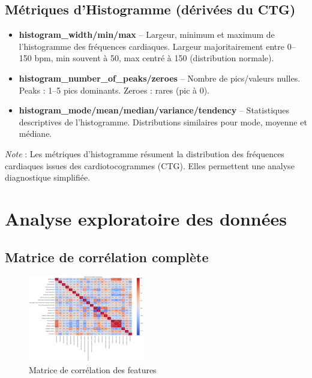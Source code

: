 \documentclass[twocolumn,10pt]{article}
\begin{document}
\subsection{Métriques d'Histogramme (dérivées du CTG)}
\begin{itemize}
    \item \textbf{histogram\_width/min/max} – Largeur, minimum et maximum de l’histogramme des fréquences cardiaques. Largeur majoritairement entre 0--150 bpm, min souvent à 50, max centré à 150 (distribution normale).

    \item \textbf{histogram\_number\_of\_peaks/zeroes} – Nombre de pics/valeurs nulles. Peaks : 1--5 pics dominants. Zeroes : rares (pic à 0).

    \item \textbf{histogram\_mode/mean/median/variance/tendency} – Statistiques descriptives de l’histogramme. Distributions similaires pour mode, moyenne et médiane.
\end{itemize}

\vspace{0.5em}
\noindent \textit{Note} : Les métriques d'histogramme résument la distribution des fréquences cardiaques issues des cardiotocogrammes (CTG). Elles permettent une analyse diagnostique simplifiée.

\section{Analyse exploratoire des données}
\subsection{Matrice de corrélation complète}
\begin{figure}[H]
    \centering
    \includegraphics[width=0.45\textwidth]{matrice de corrélation_non tronquée.png}
    \caption{Matrice de corrélation des features}
    \label{fig:mat_corr}
\end{figure}
\end{document}
